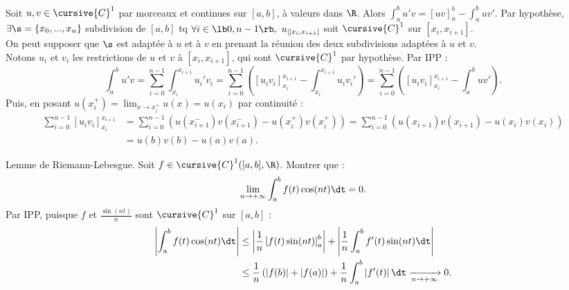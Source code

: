 \documentclass[11pt]{article}
\begin{document}
\begin{exercice}{}{}
    Soit $u,v\in\cursive{C}^1$ par morceaux et continues sur $[a,b]$, à valeurs dans $\R$. Alors $\int_a^bu'v = \left[ uv \right]_a^b - \int_a^b uv'$.
    \tcblower
    Par hypothèse, $\exists \s = \{x_0, ..., x_n\}$ subdivision de $[a,b]$ tq $\forall i \in \lb0,n-1\rb, ~ u_{|]x_i,x_{i+1}[}$ soit $\cursive{C}^1$ sur $[x_i,x_{i+1}]$.\\
    On peut supposer que $\s$ est adaptée à $u$ et à $v$ en prenant la réunion des deux subdivisions adaptées à $u$ et $v$.\\
    Notons $u_i$ et $v_i$ les restrictions de $u$ et $v$ à $[x_i,x_{i+1}]$, qui sont $\cursive{C}^1$ par hypothèse. Par IPP :
    \begin{equation*}
        \int_a^b u'v = \sum_{i=0}^{n-1} \int_{x_i}^{x_{i+1}}u_i'v_i = \sum_{i=0}^{n-1}\left(\left[ u_iv_i \right]_{x_i}^{x_{i+1}} - \int_{x_i}^{x_{i+1}}u_iv_i' \right) = \sum_{i=0}^{n-1}\left( \left[ u_iv_i \right]_{x_i}^{x_{i+1}} -  \int_a^b uv'\right).
    \end{equation*} 
    Puis, en posant $u(x_i^+)=\lim_{x\to x_i^+}u(x)=u(x_i)$ par continuité :
    \begin{align*}
        \sum_{i=0}^{n-1} [u_iv_i]_{x_i}^{x_{i+1}}&=\sum_{i=0}^{n-1}\left( u(x_{i+1}^-)v(x_{i+1}^-) - u(x_i^+)v(x_i^+) \right)=\sum_{i=0}^{n-1}\left(u(x_{i+1})v(x_{i+1})-u(x_i)v(x_i)\right)\\
        &=u(b)v(b)-u(a)v(a).
    \end{align*}
\end{exercice}

\begin{exercice}{Lemme de Riemann-Lebesgue.}{}
    Soit $f\in\cursive{C}^1([a,b],\R)$. Montrer que :
    \begin{equation*}\lim_{n\to+\infty}\int_a^b f(t)\cos(nt)\dt=0.\end{equation*}
    \tcblower
    Par IPP, puisque $f$ et $\frac{\sin(nt)}{n}$ sont $\cursive{C}^1$ sur $[a,b]$ :
    \begin{align*}
        \left|\int_a^bf(t)\cos(nt)\dt\right|&\leq \left|\frac{1}{n}\left[ f(t)\sin(nt) \right]_a^b\right| + \left|\frac{1}{n}\int_a^b f'(t)\sin(nt)\dt\right|\\
        &\leq \frac{1}{n}\left( |f(b)| + |f(a)| \right) + \frac{1}{n}\int_a^b\left|f'(t)\right|\dt \xrightarrow[n\to+\infty]{} 0.
    \end{align*}
\end{exercice}
\end{document}

